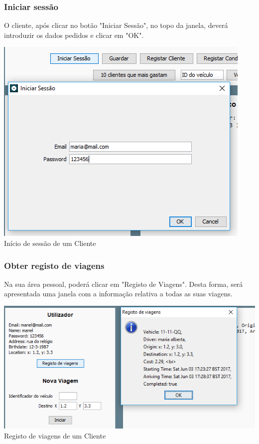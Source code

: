 \documentclass[a4paper]{article}
\begin{document}
\subsubsection{Iniciar sessão}
O cliente, após clicar no botão "Iniciar Sessão", no topo da janela, deverá introduzir os dados pedidos e clicar em "OK".
\begin{center}
  \includegraphics[scale=0.75]{cliente_iniciarsessao}\\
  \caption{Início de sessão de um Cliente}
  \label{fig:picture}
\end{center}
\subsubsection{Obter registo de viagens}
Na sua área pessoal, poderá clicar em "Registo de Viagens". Desta forma, será apresentada uma janela com a informação relativa a todas as suas viagens.
\begin{center}
  \includegraphics[scale=0.75]{cliente_registo}\\
  \caption{Registo de viagens de um Cliente}
  \label{fig:picture}
\end{center}
\end{document}
